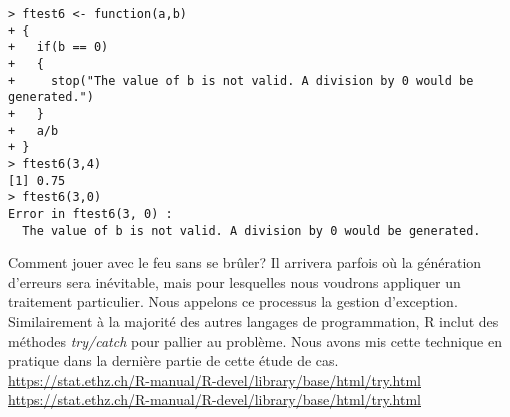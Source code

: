 \begin{lstlisting}[caption = Gestion des erreurs sous R,label=src:errorManagement]
> ftest6 <- function(a,b)
+ {
+   if(b == 0)
+   {
+     stop("The value of b is not valid. A division by 0 would be generated.")
+   }
+   a/b
+ }
> ftest6(3,4)
[1] 0.75
> ftest6(3,0)
Error in ftest6(3, 0) : 
  The value of b is not valid. A division by 0 would be generated.
\end{lstlisting}

\begin{moreInfo}{Comment jouer avec le feu sans se brûler?}
	Il arrivera parfois où la génération d'erreurs sera inévitable, mais pour lesquelles nous voudrons appliquer un traitement particulier. Nous appelons ce processus la gestion d'exception. Similairement à la majorité des autres langages de programmation, R inclut des méthodes \emph{try/catch} pour pallier au problème. Nous avons mis cette technique en pratique dans la dernière partie de cette étude de cas. \\
	\url{https://stat.ethz.ch/R-manual/R-devel/library/base/html/try.html} \\
	\url{https://stat.ethz.ch/R-manual/R-devel/library/base/html/try.html}
\end{moreInfo}